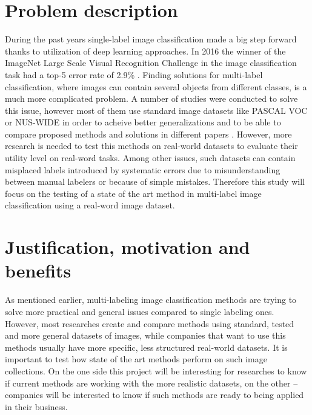\section{Problem description}
During the past years single-label image classification made a big step forward thanks to utilization of deep learning approaches. In 2016 the winner of the ImageNet Large Scale Visual Recognition Challenge in the image classification task had a top-5 error rate of 2.9\% \cite{StanfordUniversity2016, Russakovsky2015ImageNet}. Finding solutions for multi-label classification, where images can contain several objects from different classes, is a much more complicated problem. A number of studies were conducted to solve this issue, however most of them use standard image datasets like PASCAL VOC \cite{Everingham2010PASCAL-VOC} or NUS-WIDE \cite{Chua2009NUS-WIDE} in order to acheive better generalizations and to be able to compare proposed methods and solutions in different papers \cite{Wei2016HCP, Gong2013DeepRanking, Oquab2014TransferringMidLevel, Chatfield2014ReturnDevilInTheDetails}. However, more research is needed to test this methods on real-world datasets to evaluate their utility level on real-word tasks. Among other issues, such datasets can contain misplaced labels introduced by systematic errors due to misunderstanding between manual labelers or because of simple mistakes. Therefore this study will focus on the testing of a state of the art method in multi-label image classification using a real-word image dataset.


\section{Justification, motivation and benefits}
As mentioned earlier, multi-labeling image classification methods are trying to solve more practical and general issues compared to single labeling ones. However, most researches create and compare methods using standard, tested and more general datasets of images, while companies that want to use this methods usually have more specific, less structured real-world datasets. It is important to test how state of the art methods perform on such image collections. On the one side this project will be interesting for researches to know if current methods are working with the more realistic datasets, on the other -- companies will be interested to know if such methods are ready to being applied in their business.


